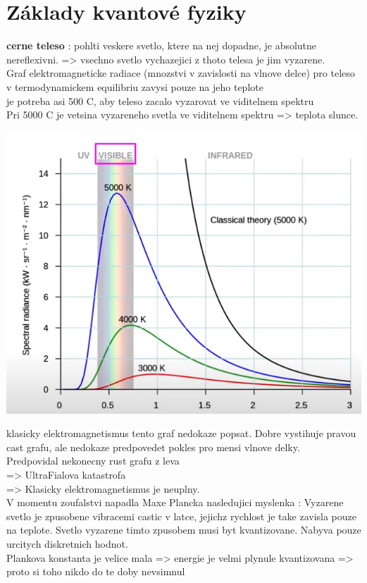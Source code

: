 \documentclass{report}
\begin{document}
\newpage


\section{Základy kvantové fyziky}

\vspace{0.5cm}
\textbf{cerne teleso} : pohlti veskere svetlo, ktere na nej dopadne, je absolutne nereflexivni. => vsechno svetlo vychazejici z thoto telesa je jim vyzarene. \\
Graf elektromagneticke radiace (mnozstvi v zavislosti na vlnove delce) pro teleso v termodynamickem equilibriu zavysi pouze na jeho teplote\\
je potreba asi 500 C, aby teleso zacalo vyzarovat ve viditelnem spektru \\
Pri 5000 C je vetsina vyzareneho svetla ve viditelnem spektru => teplota slunce.

\begin{center}
  \includegraphics[width=0.4\linewidth]{images/spektrum_radiace.png}
\end{center}

klasicky elektromagnetismus tento graf nedokaze popsat. Dobre vystihuje pravou cast grafu, ale nedokaze predpovedet pokles pro mensi vlnove delky. \\
Predpovidal nekonecny rust grafu z leva \\
=> UltraFialova katastrofa \\
=> Klasicky elektromagnetismus je neuplny. \\
V momentu zoufalstvi napadla Maxe Plancka nasledujici myslenka : Vyzarene svetlo je zpusobene vibracemi castic v latce, jejichz rychlost je take zavisla pouze na teplote. Svetlo vyzarene timto zpusobem musi byt kvantizovane. Nabyva pouze urcitych diskretnich hodnot. \\
Plankova konstanta je velice mala => energie je velmi plynule kvantizovana => proto si toho nikdo do te doby nevsimnul \\
\end{document}
